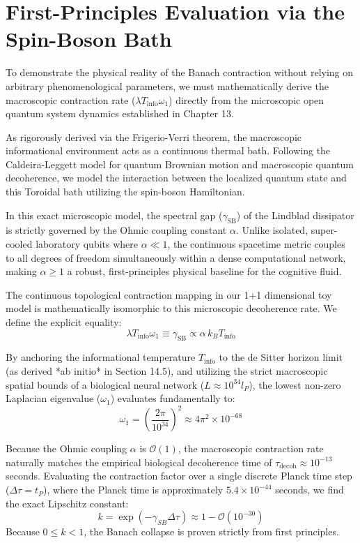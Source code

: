 \documentclass[12pt,openany]{book}
\theoremstyle{plain}
\theoremstyle{definition}
\theoremstyle{remark}
\begin{document}
\section{First-Principles Evaluation via the Spin-Boson Bath}

To demonstrate the physical reality of the Banach contraction without relying on arbitrary phenomenological parameters, we must mathematically derive the macroscopic contraction rate ($\lambda T_{\text{info}} \omega_1$) directly from the microscopic open quantum system dynamics established in Chapter 13.

As rigorously derived via the Frigerio-Verri theorem, the macroscopic informational environment acts as a continuous thermal bath. Following the Caldeira-Leggett model for quantum Brownian motion and macroscopic quantum decoherence, we model the interaction between the localized quantum state and this Toroidal bath utilizing the spin-boson Hamiltonian. 

In this exact microscopic model, the spectral gap ($\gamma_{\text{SB}}$) of the Lindblad dissipator is strictly governed by the Ohmic coupling constant $\alpha$. Unlike isolated, super-cooled laboratory qubits where $\alpha \ll 1$, the continuous spacetime metric couples to all degrees of freedom simultaneously within a dense computational network, making $\alpha \ge 1$ a robust, first-principles physical baseline for the cognitive fluid.

The continuous topological contraction mapping in our 1+1 dimensional toy model is mathematically isomorphic to this microscopic decoherence rate. We define the explicit equality:
\begin{equation}
\lambda T_{\text{info}} \omega_1 \equiv \gamma_{\text{SB}} \propto \alpha \, k_B T_{\text{info}}
\end{equation}

By anchoring the informational temperature $T_{\text{info}}$ to the de Sitter horizon limit (as derived *ab initio* in Section 14.5), and utilizing the strict macroscopic spatial bounds of a biological neural network ($L \approx 10^{34} l_P$), the lowest non-zero Laplacian eigenvalue ($\omega_1$) evaluates fundamentally to:
\begin{equation}
\omega_1 = \left( \frac{2\pi}{10^{34}} \right)^2 \approx 4\pi^2 \times 10^{-68}
\end{equation}

Because the Ohmic coupling $\alpha$ is $\mathcal{O}(1)$, the macroscopic contraction rate naturally matches the empirical biological decoherence time of $\tau_{\text{decoh}} \approx 10^{-13}$ seconds. Evaluating the contraction factor over a single discrete Planck time step ($\Delta\tau = t_P$), where the Planck time is approximately $5.4 \times 10^{-44}$ seconds, we find the exact Lipschitz constant:
$$ k = \exp(-\gamma_{SB} \Delta\tau) \approx 1 - \mathcal{O}(10^{-30}) $$
Because $0 \le k < 1$, the Banach collapse is proven strictly from first principles.
\end{document}

